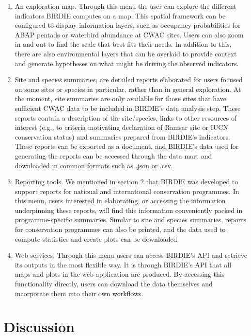 \documentclass[utf8]{frontiersSCNS}
\begin{document}
\begin{enumerate}
\def\labelenumi{\arabic{enumi}.}
\item
  An exploration map. Through this menu the user can explore the
  different indicators BIRDIE computes on a map. This spatial framework
  can be configured to display information layers, such as occupancy
  probabilities for ABAP pentads or waterbird abundance at CWAC sites.
  Users can also zoom in and out to find the scale that best fits their
  needs. In addition to this, there are also environmental layers that
  can be overlaid to provide context and generate hypotheses on what
  might be driving the observed indicators.
\item
  Site and species summaries, are detailed reports elaborated for users
  focused on some sites or species in particular, rather than in general
  exploration. At the moment, site summaries are only available for
  those sites that have sufficient CWAC data to be included in BIRDIE's
  data analysis step. These reports contain a description of the
  site/species, links to other resources of interest (e.g., to criteria
  motivating declaration of Ramsar site or IUCN conservation status) and
  summaries prepared from BIRDIE's indicators. These reports can be
  exported as a document, and BIRDIE's data used for generating the
  reports can be accessed through the data mart and downloaded in common
  formats such as .json or .csv.
\item
  Reporting tools. We mentioned in section 2 that BIRDIE was developed
  to support reports for national and international conservation
  programmes. In this menu, users interested in elaborating, or
  accessing the information underpinning these reports, will find this
  information conveniently packed in programme-specific summaries.
  Similar to site and species summaries, reports for conservation
  programmes can also be printed, and the data used to compute
  statistics and create plots can be downloaded.
\item
  Web services. Through this menu users can access BIRDIE's API and
  retrieve its outputs in the most flexible way. It is through BIRDIE's
  API that all maps and plots in the web application are produced. By
  accessing this functionality directly, users can download the data
  themselves and incorporate them into their own workflows.
\end{enumerate}

\hypertarget{discussion}{%
\section*{Discussion}\label{discussion}}
\end{document}
